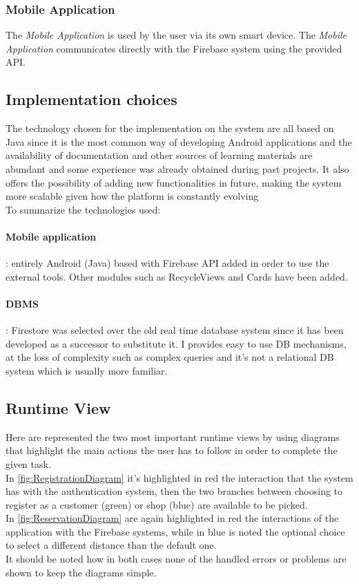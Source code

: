 \subsubsection{Mobile Application}
The \emph{Mobile Application} is used by the user via its own smart device. The \emph{Mobile Application} communicates directly with the Firebase system using the provided API.
\clearpage

\subsection{Implementation choices}
\label{Implementation choices}
The technology chosen for the implementation on the system are all based on Java since it is the most common way of developing Android applications and the availability of documentation and other sources of learning materials are abundant and some experience was already obtained during past projects. It also offers the possibility of adding new functionalities in future, making the system more scalable given how the platform is constantly evolving\\
To summarize the technologies used:
\paragraph{Mobile application}: entirely Android (Java) based with Firebase API added in order to use the external tools. Other modules such as RecycleViews and Cards have been added.
\paragraph{DBMS}: Firestore was selected over the old real time database system since it has been developed as a successor to substitute it. I provides easy to use DB mechanisms, at the loss of complexity such as complex queries and it's not a relational DB system which is usually more familiar.\\

\clearpage
\subsection{Runtime View}
Here are represented the two most important runtime views by using diagrams that highlight the main actions the user has to follow in order to complete the given task.\\
In \autoref{fig:RegistrationDiagram} it's highlighted in red the interaction that the system has with the authentication system, then the two branches between choosing to register as a customer (green) or shop (blue) are available to be picked.\\
In \autoref{fig:ReservationDiagram} are again highlighted in red the interactions of the application with the Firebase systems, while in blue is noted the optional choice to select a different distance than the default one.\\
It should be noted how in both cases none of the handled errors or problems are shown to keep the diagrams simple.

